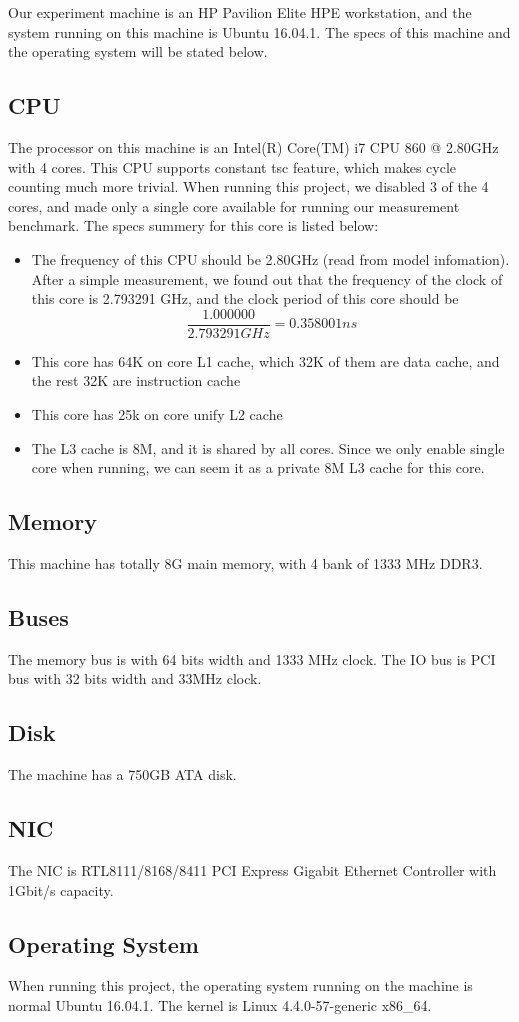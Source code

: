 Our experiment machine is an HP Pavilion Elite HPE workstation, and the system running on this machine is Ubuntu 16.04.1. The specs of this machine and the operating system will be stated below.

\subsection{CPU}

The processor on this machine is an Intel(R) Core(TM) i7 CPU 860 @ 2.80GHz with 4 cores. This CPU supports constant tsc feature, which makes cycle counting much more trivial. When running this project, we disabled 3 of the 4 cores, and made only a single core available for running our measurement benchmark. The specs summery for this core is listed below:

\begin{itemize}
    \item The frequency of this CPU should be 2.80GHz (read from model infomation). After a simple measurement, we found out that the frequency of the clock of this core is 2.793291 GHz, and the clock period of this core should be $$ \frac{1.000000}{2.793291 GHz} = 0.358001 ns $$
    \item This core has 64K on core L1 cache, which 32K of them are data cache, and the rest 32K are instruction cache
    \item This core has 25k on core unify L2 cache
    \item The L3 cache is 8M, and it is shared by all cores. Since we only enable single core when running, we can seem it as a private 8M L3 cache for this core.
\end{itemize}

\subsection{Memory}

This machine has totally 8G main memory, with 4 bank of 1333 MHz DDR3.

\subsection{Buses}

The memory bus is with 64 bits width and 1333 MHz clock. The IO bus is PCI bus with 32 bits width and 33MHz clock.

\subsection{Disk}
The machine has a 750GB ATA disk.

\subsection{NIC}

The NIC is RTL8111/8168/8411 PCI Express Gigabit Ethernet Controller with 1Gbit/s capacity.

\subsection{Operating System}
When running this project, the operating system running on the machine is normal Ubuntu 16.04.1. The kernel is Linux 4.4.0-57-generic x86\_64.
